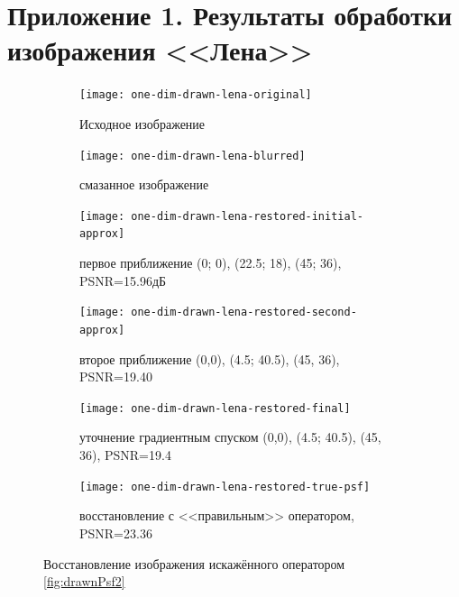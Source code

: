 \chapter*{Приложение 1. Результаты обработки изображения <<Лена>>}
\begin{figure}[h!]
	\centering
	\begin{subfigure}[t]{0.32\textwidth}
		\centering
		\texttt{[image: one-dim-drawn-lena-original]}
		\caption{Исходное изображение}
	\end{subfigure}
	\hfill
	\begin{subfigure}[t]{0.32\textwidth}
		\centering
		\texttt{[image: one-dim-drawn-lena-blurred]}
		\caption{смазанное изображение}
	\end{subfigure}
	\hfill
	\begin{subfigure}[t]{0.32\textwidth}
		\centering
		\texttt{[image: one-dim-drawn-lena-restored-initial-approx]}
		\caption{первое приближение (0; 0), (22.5; 18), (45; 36), PSNR=15.96дБ}
	\end{subfigure}
	\begin{subfigure}[t]{0.32\textwidth}
		\centering
		\texttt{[image: one-dim-drawn-lena-restored-second-approx]}
		\caption{второе приближение (0,0), (4.5; 40.5), (45, 36), PSNR=19.40}
	\end{subfigure}
	\hfill
	\begin{subfigure}[t]{0.32\textwidth}
		\centering
		\texttt{[image: one-dim-drawn-lena-restored-final]}
		\caption{уточнение градиентным спуском (0,0), (4.5; 40.5), (45, 36), PSNR=19.4}
	\end{subfigure}
	\hfill
	\begin{subfigure}[t]{0.32\textwidth}
		\centering
		\texttt{[image: one-dim-drawn-lena-restored-true-psf]}
		\caption{восстановление с <<правильным>> оператором, PSNR=23.36}
	\end{subfigure}
	\label{fig:oneDimDrawnLena}
	\caption{Восстановление изображения искажённого оператором \ref{fig:drawnPsf2}}
\end{figure}

